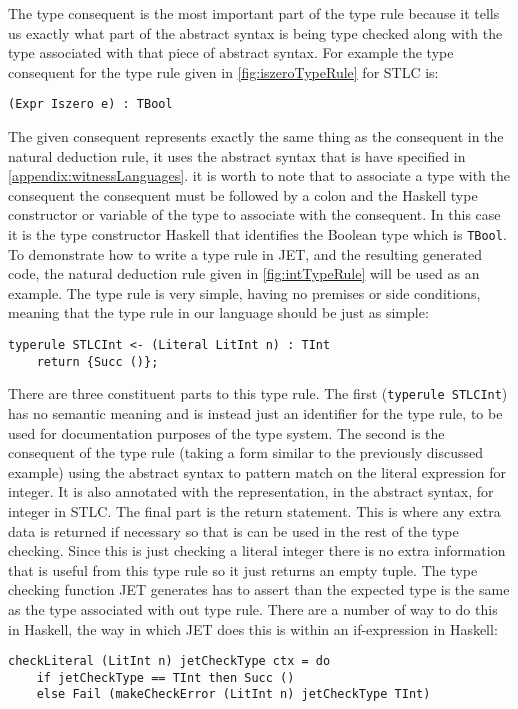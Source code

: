 The type consequent is the most important part of the type rule because it tells us exactly what part of the abstract syntax is being type checked along with the type associated with that piece of abstract syntax.
For example the type consequent for the type rule given in \autoref{fig:iszeroTypeRule} for STLC is:
\begin{lstlisting}[numbers=none]
(Expr Iszero e) : TBool
\end{lstlisting}
The given consequent represents exactly the same thing as the consequent in the natural deduction rule, it uses the abstract syntax that is have specified in \autoref{appendix:witnessLanguages}.
it is worth to note that to associate a type with the consequent the consequent must be followed by a colon and the Haskell type constructor or variable of the type to associate with the consequent.
In this case it is the type constructor Haskell that identifies the Boolean type which is \texttt{TBool}.
To demonstrate how to write a type rule in JET, and the resulting generated code, the natural deduction rule given in \autoref{fig:intTypeRule} will be used as an example.
The type rule is very simple, having no premises or side conditions, meaning that the type rule in our language should be just as simple:
\begin{lstlisting}[numbers=none]
typerule STLCInt <- (Literal LitInt n) : TInt 
    return {Succ ()};
\end{lstlisting}
There are three constituent parts to this type rule.
The first (\texttt{typerule STLCInt}) has no semantic meaning and is instead just an identifier for the type rule, to be used for documentation purposes of the type system.
The second is the consequent of the type rule (taking a form similar to the previously discussed example) using the abstract syntax to pattern match on the literal expression for integer.
It is also annotated with the representation, in the abstract syntax, for integer in STLC.
The final part is the return statement.
This is where any extra data is returned if necessary so that is can be used in the rest of the type checking.
Since this is just checking a literal integer there is no extra information that is useful from this type rule so it just returns an empty tuple.
The type checking function JET generates has to assert than the expected type is the same as the type associated with out type rule.
There are a number of way to do this in Haskell, the way in which JET does this is within an if-expression in Haskell:
\begin{lstlisting}
checkLiteral (LitInt n) jetCheckType ctx = do
    if jetCheckType == TInt then Succ () 
    else Fail (makeCheckError (LitInt n) jetCheckType TInt)
\end{lstlisting}
